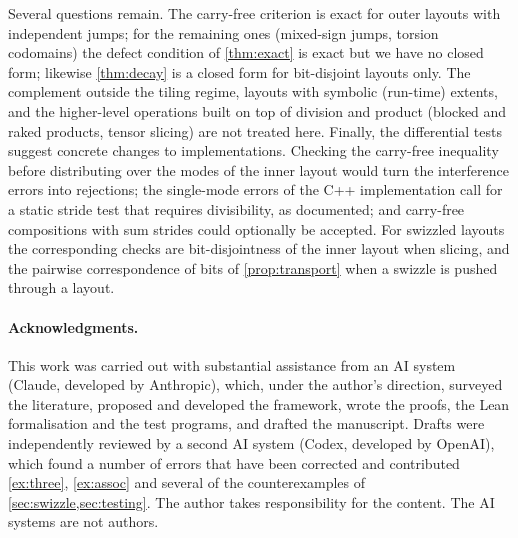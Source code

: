 Several questions remain. The carry-free criterion is exact for outer layouts with independent
jumps; for the remaining ones (mixed-sign jumps, torsion codomains) the defect condition of
\cref{thm:exact} is exact but we have no closed form; likewise \cref{thm:decay} is a closed form
for bit-disjoint layouts only. The complement outside the tiling regime,
layouts with symbolic (run-time) extents, and the higher-level operations built on top of
division and product (blocked and raked products, tensor slicing) are not treated here. Finally,
the differential tests suggest concrete changes to implementations. Checking the carry-free
inequality before distributing over the modes of the inner layout would turn the interference
errors into rejections; the single-mode errors of the C++ implementation call for a static stride
test that requires divisibility, as documented; and carry-free compositions with sum strides
could optionally be accepted. For swizzled layouts the corresponding checks are bit-disjointness
of the inner layout when slicing, and the pairwise correspondence of bits of
\cref{prop:transport} when a swizzle is pushed through a layout.

\paragraph{Acknowledgments.}
This work was carried out with substantial assistance from an AI system (Claude, developed by
Anthropic), which, under the author's direction, surveyed the literature, proposed and developed
the framework, wrote the proofs, the Lean formalisation and the test programs, and drafted the
manuscript. Drafts were independently reviewed by a second AI system (Codex, developed by
OpenAI), which found a number of errors that have been corrected and contributed \cref{ex:three},
\cref{ex:assoc} and several of the counterexamples of \cref{sec:swizzle,sec:testing}. The author
takes responsibility for the content. The AI systems are not authors.
